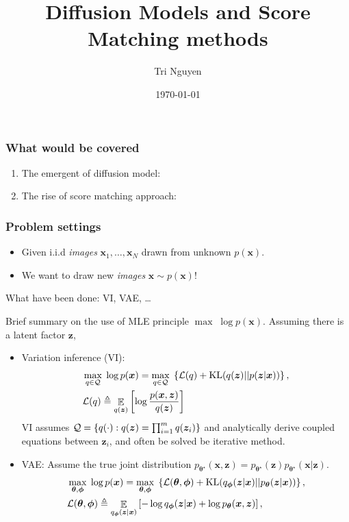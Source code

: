 \documentclass[10pt,xcolor={usenames,dvipsnames,table}]{beamer}
\title[Title]{Diffusion Models and Score Matching methods}
\author{Tri Nguyen}
\institute[OSU] 
{
Internal reading group \\
Oregon State University 
}
\date{\today} %
\begin{document}
\frame{\titlepage}

\begin{frame}
\frametitle{What would be covered}
\begin{enumerate}
    \item The emergent of diffusion model: 
    \item The rise of score matching approach: 
\end{enumerate}
\end{frame}

\begin{frame}
    \frametitle{Problem settings}
    \begin{itemize}
        \item Given i.i.d \textit{images} $\bm{x}_1, \ldots , \bm{x}_N$ drawn from unknown $p(\bm{x})$.
        \item We want to draw new \textit{images} $\bm{x} \sim p(\bm{x})$!
    \end{itemize}
    What have been done: VI, VAE, \ldots 

    Brief summary on the use of MLE principle $\max \; \log p(\bm{x})$. Assuming there is a latent factor $\bm{z}$, 
    \begin{itemize}
        \item Variation inference (VI): 
            \begin{align*}
            & \max_{q \in \mathcal{Q}} \; \log p(\bm{x}) = \max_{q \in \mathcal{Q}}\; \left\{\mathcal{L}(q) + \text{KL}(q(\bm{z}) || p(\bm{z}|\bm{x}))\right\}, \\
            &\mathcal{L}(q) \triangleq \mathop{\mathbb{E}}_{q(\bm{z})} \left[   \log \dfrac{p(\bm{x}, \bm{z})}{q(\bm{z})}\right]
            \end{align*}
            VI assumes $\mathcal{Q} = \left\{q(\cdot): q(\bm{z}) = \prod_{i=1}^{m} q(\bm{z}_i)\right\}$ and analytically derive coupled equations between $\bm{z}_i$, and often be solved be iterative method.
        \item VAE: Assume the true joint distribution $p_{\boldsymbol \theta^{\star }}(\bm{x}, \bm{z}) = p_{\boldsymbol \theta^{\star }}(\bm{z})p_{\boldsymbol \theta^{\star }}(\bm{x}|\bm{z})$.
            \begin{align*}
            & \max_{\boldsymbol \theta, \boldsymbol \phi} \; \log p(\bm{x}) = \max_{\boldsymbol \theta, \boldsymbol \phi}\; \left\{ \mathcal{L}(\boldsymbol \theta, \boldsymbol \phi) + \text{KL}(q_{\boldsymbol \phi}(\bm{z} | \bm{x}) || p_{\boldsymbol \theta} (\bm{z} | \bm{x}))\right\}, \\
            &\mathcal{L}(\boldsymbol \theta, \boldsymbol \phi) \triangleq \mathop{\mathbb{E}}_{q_{\boldsymbol \phi}(\bm{z} | \bm{x})} \left[ -\log q_{\boldsymbol \phi}(\bm{z}| \bm{x}) + \log p_{\boldsymbol \theta} (\bm{x}, \bm{z}) \right], \quad
            \end{align*}
            

\end{itemize}
\end{frame}
\end{document}
